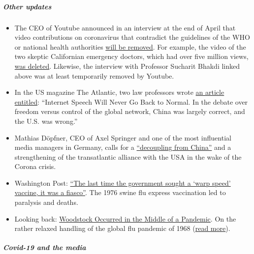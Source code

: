 \hypertarget{other-updates}{%
\subparagraph{\texorpdfstring{\textbf{Other
updates}}{Other updates}}\label{other-updates}}

\begin{itemize}
\tightlist
\item
  The CEO of Youtube announced in an interview at the end of April that
  video contributions on coronavirus that contradict the guidelines of
  the WHO or national health authorities
  \href{https://www.businessinsider.com/youtube-will-ban-anything-against-who-guidance-2020-4}{will
  be removed}. For example, the video of the two skeptic Californian
  emergency doctors, which had over five million views,
  \href{https://www.turnto23.com/news/coronavirus/video-interview-with-dr-dan-erickson-and-dr-artin-massihi-taken-down-from-youtube}{was
  deleted}. Likewise, the interview with Professor Sucharit Bhakdi
  linked above was at least temporarily removed by Youtube.
\item
  In the US magazine The Atlantic, two law professors wrote
  \href{https://www.theatlantic.com/ideas/archive/2020/04/what-covid-revealed-about-internet/610549/}{an
  article entitled}: ``Internet Speech Will Never Go Back to Normal. In
  the debate over freedom versus control of the global network, China
  was largely correct, and the U.S. was wrong.''
\item
  Mathias Döpfner, CEO of Axel Springer and one of the most influential
  media managers in Germany, calls for a
  \href{https://www.german-foreign-policy.com/news/detail/8263/}{``decoupling
  from China''} and a strengthening of the transatlantic alliance with
  the USA in the wake of the Corona crisis.
\item
  Washington Post:
  \href{https://www.washingtonpost.com/history/2020/05/01/vaccine-swine-flu-coronavirus/}{``The
  last time the government sought a `warp speed' vaccine, it was a
  fiasco''}. The 1976 swine flu express vaccination led to paralysis and
  deaths.
\item
  Looking back:
  \href{https://www.aier.org/article/woodstock-occurred-in-the-middle-of-a-pandemic/}{Woodstock
  Occurred in the Middle of a Pandemic}. On the rather relaxed handling
  of the global flu pandemic of 1968
  (\href{https://www.britannica.com/event/Hong-Kong-flu-of-1968}{read
  more}).
\end{itemize}

\hypertarget{covid-19-and-the-media}{%
\subparagraph{\texorpdfstring{\textbf{Covid-19 and the
media}}{Covid-19 and the media}}\label{covid-19-and-the-media}}

